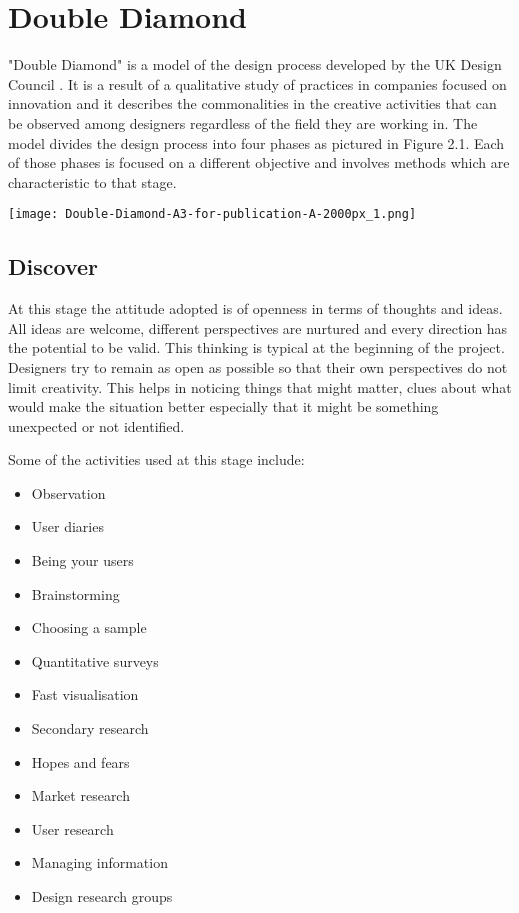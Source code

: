 	\section{Double Diamond}
	
"Double Diamond" is a model of the design process developed by the UK Design Council \citep{council2007eleven, council2005double}. It is a result of a qualitative study of practices in companies focused on innovation and it describes the commonalities in the creative activities that can be observed among designers regardless of the field they are working in. The model divides the design process into four phases as pictured in Figure 2.1. Each of those phases is focused on a different objective and involves methods which are characteristic to that stage.

\begin{center}
  \texttt{[image: Double-Diamond-A3-for-publication-A-2000px\_1.png]}
\end{center}

		\subsection{Discover}

At this stage the attitude adopted is of openness in terms of thoughts and ideas. All ideas are welcome, different perspectives are nurtured and every direction has the potential to be valid. This thinking is typical at the beginning of the project. Designers try to remain as open as possible so that their own perspectives do not limit creativity. This helps in noticing things that might matter, clues about what would make the situation better especially that it might be something unexpected or not identified.

Some of the activities used at this stage include:
\begin{itemize}
\item Observation
\item User diaries
\item Being your users
\item Brainstorming
\item Choosing a sample
\item Quantitative surveys
\item Fast visualisation
\item Secondary research
\item Hopes and fears
\item Market research
\item User research
\item Managing information
\item Design research groups
\end{itemize}

